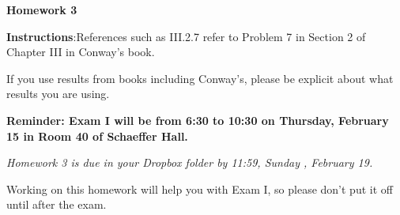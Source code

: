 \documentclass{article}%
\begin{document}
\begin{center}

\textbf{Homework 3}\bigskip

\end{center}



\noindent\textbf{Instructions}:References such as III.2.7 refer to Problem 7 in Section 2 of Chapter III in Conway's book.\smallskip



\noindent If you use results from books including Conway's, please be explicit about what results you are using.

\noindent \textbf{Reminder: Exam I will be from 6:30 to 10:30 on Thursday, February 15 in Room 40 of Schaeffer Hall.}






\begin{center}

\emph{Homework 3 is due in your Dropbox folder by 11:59, Sunday , February 19.}

\end{center} 

\medskip

\noindent Working on this homework will help you with Exam I, so please don't put it off until after the exam.
\end{document}
